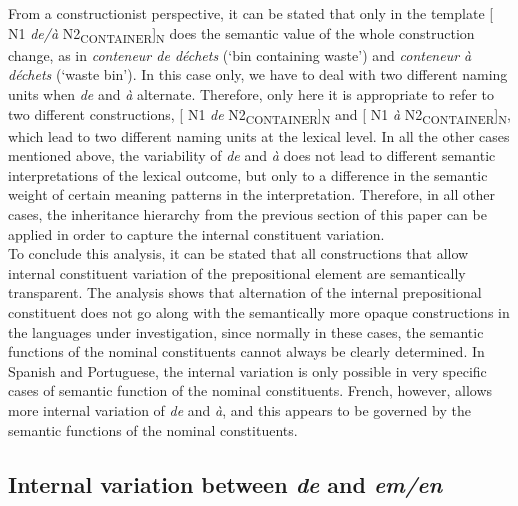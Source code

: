 \documentclass[output=paper]{langsci/langscibook}
\begin{document}
From a constructionist perspective, it can be stated that only in the template [ N1 \textit{de/à} N2\textsubscript{CONTAINER}]\textsubscript{N} does the semantic value of the whole construction change, as in \textit{conteneur de déchets} (`bin containing waste') and \textit{conteneur à déchets} (`waste bin'). In this case only, we have to deal with two different naming units when \textit{de} and \textit{à} alternate. Therefore, only here it is appropriate to refer to two different constructions, [ N1 \textit{de} N2\textsubscript{CONTAINER}]\textsubscript{N} and  [ N1 \textit{à} N2\textsubscript{CONTAINER}]\textsubscript{N}, which lead to two different naming units at the lexical level. In all the other cases mentioned above, the variability of \textit{de} and \textit{à} does not lead to different semantic interpretations of the lexical outcome, but only to a difference in the semantic weight of certain meaning patterns in the interpretation. Therefore, in all other cases, the inheritance hierarchy from the previous section of this paper can be applied in order to capture the internal constituent variation.\\

To conclude this analysis, it can be stated that all constructions that allow internal constituent variation of the prepositional element are semantically transparent.  The analysis shows that alternation of the internal prepositional constituent does not go along with the semantically more opaque constructions in the languages under investigation, since normally in these cases, the semantic functions of the nominal constituents cannot always be clearly determined. In Spanish and Portuguese, the internal variation is only possible in very specific cases of semantic function of the nominal constituents. French, however, allows more internal variation of \textit{de} and \textit{à}, and this appears to be governed by the semantic functions of the nominal constituents.

\subsection{Internal variation between \textit{de} and \textit{em/en}}
\end{document}
